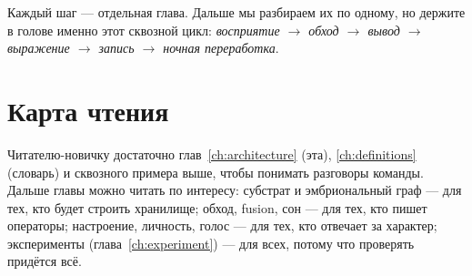 Каждый шаг — отдельная глава. Дальше мы разбираем их по одному, но держите в голове
именно этот сквозной цикл: \emph{восприятие $\to$ обход $\to$ вывод $\to$ выражение
$\to$ запись $\to$ ночная переработка}.

\section{Карта чтения}

Читателю-новичку достаточно глав~\ref{ch:architecture} (эта),
\ref{ch:definitions} (словарь) и сквозного примера выше, чтобы понимать разговоры
команды. Дальше главы можно читать по интересу: субстрат и эмбриональный граф — для
тех, кто будет строить хранилище; обход, fusion, сон — для тех, кто пишет
операторы; настроение, личность, голос — для тех, кто отвечает за характер;
эксперименты (глава~\ref{ch:experiment}) — для всех, потому что проверять придётся
всё.
